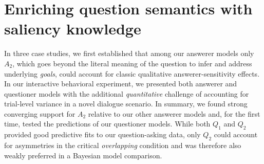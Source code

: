 \documentclass[12pt, floatsintext, jou]{apa6}
\begin{document}



\section{Enriching question semantics with saliency knowledge}

In three case studies, we first established that among our answerer models only $A_2$, which goes beyond the literal meaning of the question to infer and address underlying \emph{goals}, could account for classic qualitative answerer-sensitivity effects. In our interactive behavioral experiment, we presented both answerer and questioner models with the additional \emph{quantitative} challenge of accounting for trial-level variance in a novel dialogue scenario. In summary, we found strong converging support for $A_2$ relative to our other answerer models and, for the first time, tested the predictions of our questioner models. While both $Q_1$ and $Q_2$ provided good predictive fits to our question-asking data, only $Q_2$ could account for asymmetries in the critical \emph{overlapping} condition and was therefore also weakly preferred in a Bayesian model comparison. 
\end{document}
